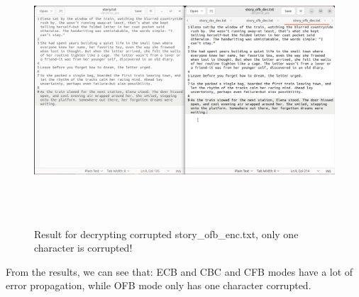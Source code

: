 \documentclass{article}
\begin{document}
\begin{figure}[h]
    \centering
    \includegraphics[height=10cm]{images/text_comp_ofb.png}
    \caption{Result for decrypting corrupted story\_ofb\_enc.txt, only one character is corrupted!}
\end{figure}
From the results, we can see that: ECB and CBC and CFB modes have a lot of error propagation, while OFB mode only has one character corrupted.
\end{document}
